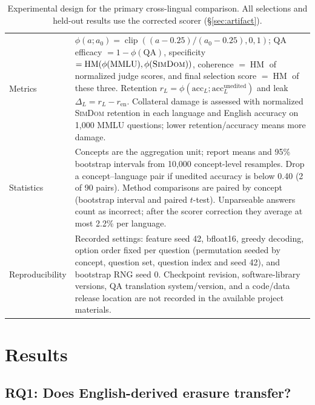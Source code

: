\documentclass[11pt]{article}
\begin{document}
\begin{table}[t]
\begin{tabular}{@{}p{}p{}@{}}
Metrics & $\phi(a;a_0)=\operatorname{clip}((a-0.25)/(a_0-0.25),0,1)$; QA efficacy $=1-\phi(\text{QA})$, specificity $=\operatorname{HM}(\phi(\text{MMLU}),\phi(\textsc{SimDom}))$, coherence $=\operatorname{HM}$ of normalized judge scores, and final selection score $=\operatorname{HM}$ of these three. Retention $r_L=\phi(\mathrm{acc}_L;\mathrm{acc}^{\mathrm{unedited}}_L)$ and leak $\Delta_L=r_L-r_{\mathrm{en}}$. Collateral damage is assessed with normalized \textsc{SimDom} retention in each language and English accuracy on 1{,}000 MMLU questions; lower retention/accuracy means more damage. \\
Statistics & Concepts are the aggregation unit; report means and 95\% bootstrap intervals from 10{,}000 concept-level resamples. Drop a concept--language pair if unedited accuracy is below 0.40 (2 of 90 pairs). Method comparisons are paired by concept (bootstrap interval and paired $t$-test). Unparseable answers count as incorrect; after the scorer correction they average at most 2.2\% per language. \\
Reproducibility & Recorded settings: feature seed 42, bfloat16, greedy decoding, option order fixed per question (permutation seeded by concept, question set, question index and seed 42), and bootstrap RNG seed 0. Checkpoint revision, software-library versions, QA translation system/version, and a code/data release location are not recorded in the available project materials. \\
\bottomrule
\end{tabular}
\caption{Experimental design for the primary cross-lingual comparison. All selections and held-out results use the corrected scorer (\S\ref{sec:artifact}).}
\label{tab:design}
\end{table}

\section{Results}

\subsection{RQ1: Does English-derived erasure transfer?}
\end{document}
